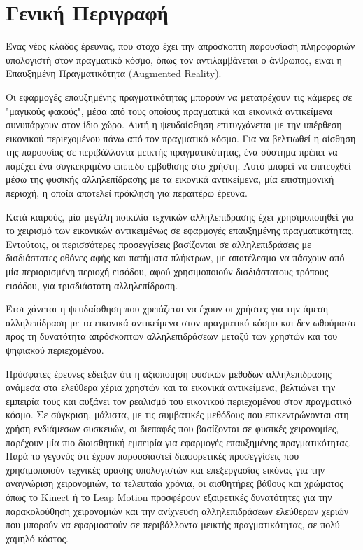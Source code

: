 

 \label{c:intro}


\section{Γενική Περιγραφή}


Ένας νέος κλάδος έρευνας, που στόχο έχει την απρόσκοπτη παρουσίαση πληροφοριών υπολογιστή στον πραγματικό κόσμο, όπως τον αντιλαμβάνεται ο άνθρωπος, είναι η Επαυξημένη Πραγματικότητα (Augmented Reality).

Οι εφαρμογές επαυξημένης πραγματικότητας μπορούν να μετατρέχουν τις κάμερες σε "μαγικούς φακούς", μέσα από τους οποίους πραγματικά και εικονικά αντικείμενα συνυπάρχουν στον ίδιο χώρο.
Αυτή η ψευδαίσθηση επιτυγχάνεται με την υπέρθεση εικονικού περιεχομένου πάνω από τον πραγματικό κόσμο. Για να βελτιωθεί η αίσθηση της παρουσίας σε περιβάλλοντα μεικτής πραγματικότητας, ένα σύστημα πρέπει να παρέχει ένα συγκεκριμένο επίπεδο εμβύθισης στο χρήστη. Αυτό μπορεί να επιτευχθεί μέσω της φυσικής αλληλεπίδρασης με τα εικονικά αντικείμενα, μία επιστημονική περιοχή, η οποία αποτελεί πρόκληση για περαιτέρω έρευνα.

Κατά καιρούς, μία μεγάλη ποικιλία τεχνικών αλληλεπίδρασης έχει χρησιμοποιηθεί για το χειρισμό των εικονικών αντικειμένως σε εφαρμογές επαυξημένης πραγματικότητας. Εντούτοις, οι περισσότερες προσεγγίσεις βασίζονται σε αλληλεπιδράσεις με δισδιάστατες οθόνες αφής και πατήματα πλήκτρων, με αποτέλεσμα να πάσχουν από μία περιορισμένη περιοχή εισόδου, αφού χρησιμοποιούν δισδιάστατους τρόπους εισόδου, για τρισδιάστατη αλληλεπίδραση.

Έτσι χάνεται η ψευδαίσθηση που χρειάζεται να έχουν οι χρήστες για την άμεση αλληλεπίδραση με τα εικονικά αντικείμενα στον πραγματικό κόσμο και δεν ωθούμαστε προς τη δυνατότητα απρόσκοπτων αλληλεπιδράσεων μεταξύ των χρηστών και του ψηφιακού περιεχομένου.

Πρόσφατες έρευνες έδειξαν ότι η αξιοποίηση φυσικών μεθόδων αλληλεπίδρασης ανάμεσα στα ελεύθερα χέρια χρηστών και τα εικονικά αντικείμενα, βελτιώνει την εμπειρία τους και αυξάνει τον ρεαλισμό του εικονικού περιεχομένου στον πραγματικό κόσμο. 
Σε σύγκριση, μάλιστα, με τις συμβατικές μεθόδους που επικεντρώνονται στη χρήση ενδιάμεσων συσκευών, οι διεπαφές που βασίζονται σε φυσικές χειρονομίες, παρέχουν μία πιο διαισθητική εμπειρία για εφαρμογές επαυξημένης πραγματικότητας. Παρά το γεγονός ότι έχουν παρουσιαστεί διαφορετικές προσεγγίσεις που χρησιμοποιούν τεχνικές όρασης υπολογιστών και επεξεργασίας εικόνας για την αναγνώριση χειρονομιών, τα τελευταία χρόνια, οι αισθητήρες βάθους και χρώματος όπως το Kinect ή το Leap Motion προσφέρουν εξαιρετικές δυνατότητες για την παρακολούθηση χειρονομιών και την ανίχνευση αλληλεπιδράσεων ελεύθερων χεριών που μπορούν να εφαρμοστούν σε περιβάλλοντα μεικτής πραγματικότητας, σε πολύ χαμηλό κόστος.

